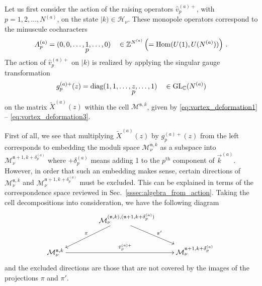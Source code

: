 \documentclass[12pt,a4paper]{article}
\newcommand{\nn}{\mathfrak{n}}
\renewcommand{\(}{\left(}
\renewcommand{\)}{\right)}
\renewcommand{\(}{\left(}
\renewcommand{\)}{\right)}
\begin{document}
\medskip

Let us first consider the action of the raising operators $\hat{v}^{(a)+}_p$, with  $p=1,2,\dots,N^{(a)}$, on the state $|k)\in\mathcal{H}_\nu$. 
These monopole operators correspond to the minuscule cocharacters
\begin{equation}
A^{(a)}_p=(0,0,\dots, \stackunder{$1$}{$p$},\dots,0)\quad \in \mathbb{Z}^{N^{(a)}}\left(= \mathrm{Hom}(U(1),U(N^{(a)}))\right)\,.
\end{equation}
The action of $\hat{v}^{(a)+}_p$ on $|k)$ is realized by applying the singular gauge transformation 
\begin{equation}
g^{(a)+}_{p}(z)=\textrm{diag}(1,1,\dots, \stackunder{$z$}{$p$},\dots,1)\quad \in \text{GL}_{\mathbb{C}}(N^{(a)})
\end{equation}
on the matrix $\tilde{X}^{(a)}(z)$ within the cell $\mathcal{M}^{\nn, k}$, given by \eqref{eq:vortex_deformation1} -- \eqref{eq:vortex_deformation3}. 

First of all, we see that
multiplying $\tilde{X}^{(a)}(z)$ by $g^{(a)+}_{p}(z)$ from the left corresponds to embedding the moduli space $\mathcal{M}_\nu^{\nn,k}$ as a subspace into $ \mathcal{M}_\nu^{\nn+1,k+\delta^{(a)}_{p}} $ 
where $+\delta^{(a)}_{p}$ means adding 1 to the $p^{\textrm{th}}$ component of $\vec{k}^{(a)}$.
However, in order that such an embedding makes sense, certain directions of $\mathcal{M}_\nu^{\nn,k}$ and $\mathcal{M}_\nu^{\nn+1,k+\delta^{(a)}_{p}}$ must be excluded. 
This can be explained in terms of the correspondence space reviewed in Sec.~\ref{sssec:algebra_from_action}. 
Taking the cell decompositions into consideration, we have the following diagram
\begin{equation}\label{eq:monopole_correspondence}
\xymatrix{
  &\quad\quad\mathcal{M}^{(\nn,k),(\nn+1,k+\delta^{(a)}_p)}_\nu \ar[dr]^{\pi'} \ar@{->}[dl]_-{\pi} \\
  \mathcal{M}^{\nn,k}_\nu \ar[rr]^{{\hat{v}^{(a)+}_p}} & &\mathcal{M}^{\nn+1,k+\delta^{(a)}_p}_\nu
}\,
\end{equation}
and the excluded directions are those that are not covered by the images of the projections $\pi$ and $\pi'$.
\end{document}
